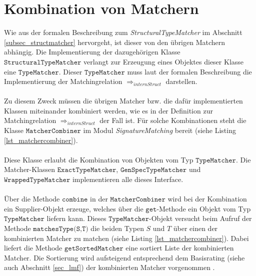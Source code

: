 \chapter{Kombination von Matchern}\label{app_matchercombination}
Wie aus der formalen Beschreibung zum \emph{StructuralTypeMatcher} im Abschnitt \ref{subsec_structmatcher} hervorgeht, ist dieser von den übrigen Matchern abhängig. Die Implementierung der dazugehörigen Klasse $\texttt{StructuralTypeMatcher}$ verlangt zur Erzeugung eines Objektes dieser Klasse eine $\texttt{TypeMatcher}$. Dieser $\texttt{TypeMatcher}$ muss laut der formalen Beschreibung die Implementierung der Matchingrelation $\Rightarrow_{internStruct}$ darstellen.
\\\\
Zu diesem Zweck müssen die übrigen Matcher bzw. die dafür implementierten Klassen miteinander kombiniert werden, wie es in der Definition zur Matchingrelation $\Rightarrow_{internStruct}$ der Fall ist. Für solche Kombinationen steht die Klasse $\texttt{MatcherCombiner}$ im Modul \emph{SignatureMatching} bereit (siehe Listing \ref{lst_matchercombiner}).
\\\\
Diese Klasse erlaubt die Kombination von Objekten vom Typ $\texttt{TypeMatcher}$. 
Die Matcher-Klassen $\texttt{ExactTypeMatcher}$, $\texttt{GenSpecTypeMatcher}$ und $\texttt{WrappedTypeMatcher}$ implementieren alle dieses \Gls{Interface}. 
\\\\
Über die Methode $\texttt{combine}$ in der $\texttt{MatcherCombiner}$ wird bei der Kombination ein Supplier-Objekt erzeuge, welches über die $\texttt{get}$-Methode ein Objekt vom Typ $\texttt{TypeMatcher}$ liefern kann. Dieses $\texttt{TypeMatcher}$-Objekt versucht beim Aufruf der Methode $\texttt{matchesType(S,T)}$ die beiden Typen $S$ und $T$ über einen der kombinierten Matcher zu matchen (siehe  Listing \ref{lst_matchercombiner}). Dabei liefert die Methode $\texttt{getSortedMatcher}$ eine sortiert Liste der kombinierten Matcher. Die Sortierung wird aufsteigend entsprechend dem Basisrating (siehe auch Abschnitt \ref{sec_lmf}) der kombinierten Matcher vorgenommen .
